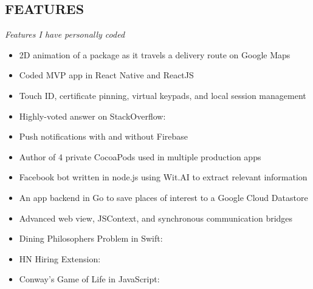 \documentclass[margin]{res}
\begin{document}
\begin{resume}
\section{FEATURES}   
	{\sl Features I have personally coded}    
		\begin{itemize}    \itemsep -2pt %
		\renewcommand\labelitemi{\tiny$\blacksquare$}
			\item 2D animation of a package as it travels a delivery route on Google Maps
			\item Coded MVP app in React Native and ReactJS 
			\item Touch ID, certificate pinning, virtual keypads, and local session management
			\item Highly-voted answer on StackOverflow: \hfill{}
			\item Push notifications with and without Firebase
			\item Author of 4 private CocoaPods used in multiple production apps
			\item Facebook bot written in node.js using Wit.AI to extract relevant information
			\item An app backend in Go to save places of interest to a Google Cloud Datastore
			\item Advanced web view, JSContext, and synchronous communication bridges
			\item Dining Philosophers Problem in Swift: \hfill{}
	    		\item HN Hiring Extension: \hfill{}
	    		\item Conway's Game of Life in JavaScript: \hfill{}
                	\end{itemize}
	
\end{resume}
\end{document}
